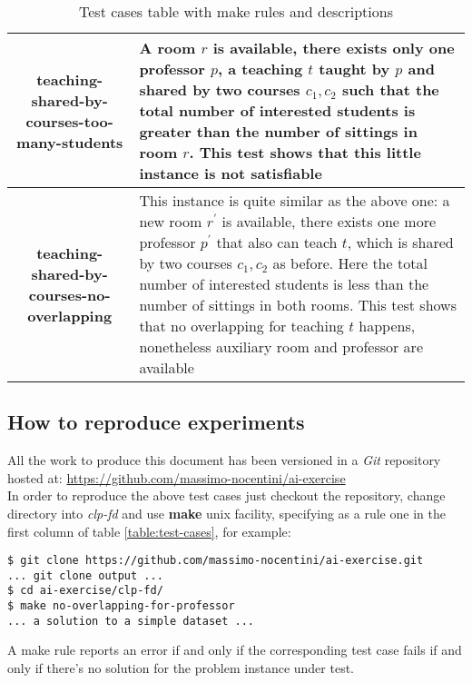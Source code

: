 \documentclass[10pt,a4paper]{article} %
\begin{document}
\begin{table}
\begin{tabular}{ c | p{6cm} }
            \hline
            \textbf{teaching-shared-by-courses-too-many-students} &
                A room $r$ is available,
                there exists only one professor $p$, a teaching $t$ taught by $p$
                and shared by two courses $c_1, c_2$ such that the total number
                of interested students is greater than the number of sittings in
                room $r$.
                This test shows that this little instance is not satisfiable \\
            \hline
            \textbf{teaching-shared-by-courses-no-overlapping} &
                This instance is quite similar as the above one: a new
                room $r^\prime$ is available, there exists one more professor
                $p^\prime$ that also can teach $t$, which is shared by two
                courses $c_1, c_2$ as before. Here the total number
                of interested students is less than the number of sittings in
                both rooms. This test shows that no overlapping for teaching $t$
                happens, nonetheless auxiliary room and professor are available \\
            \end{tabular}

        \caption{Test cases table with make rules and descriptions}
    \end{table}

    \subsection{How to reproduce experiments}
    All the work to produce this document has been versioned in a
    \emph{Git} repository hosted at:
    \url{https://github.com/massimo-nocentini/ai-exercise}\\
    In order to reproduce the above test cases just checkout the
    repository, change directory into \emph{clp-fd} and use \textbf{make}
    unix facility, specifying as a rule one in the first column of table
    \ref{table:test-cases}, for example:
    \begin{verbatim}
$ git clone https://github.com/massimo-nocentini/ai-exercise.git
... git clone output ...
$ cd ai-exercise/clp-fd/
$ make no-overlapping-for-professor
... a solution to a simple dataset ...
    \end{verbatim}
    A make rule reports an error if and only if the corresponding
    test case fails if and only if there's no solution for the
    problem instance under test.
\end{document}
